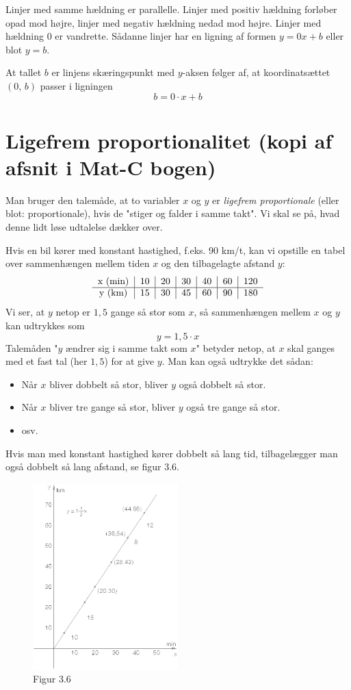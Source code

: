 \documentclass[12pt,oneside,a4paper]{article}
\begin{document}
Linjer med samme hældning er parallelle. Linjer med positiv hældning forløber
opad mod højre, linjer med negativ hældning nedad mod højre. Linjer med
hældning 0 er vandrette.  Sådanne linjer har en ligning af formen $y=0x+b$
eller blot $y=b$.

At tallet $b$ er linjens skæringspunkt med $y$-aksen følger af, at
koordinatsættet $(0,\,b)$ passer i ligningen
$$
b = 0\cdot x+b
$$

\section{Ligefrem proportionalitet (kopi af afsnit i Mat-C bogen)}
Man bruger den talemåde, at to variabler $x$ og $y$ er {\em ligefrem
proportionale} (eller blot: proportionale), hvis de "stiger og falder i samme
takt". Vi skal se på, hvad denne lidt løse udtalelse dækker over.

Hvis en bil kører med konstant hastighed, f.eks. 90 km/t, kan vi opstille en
tabel over sammenhængen mellem tiden $x$ og den tilbagelagte afstand $y$:
$$
\begin{tabular}{c|c|c|c|c|c|c}
    x ({\rm min}) & 10 & 20 & 30 & 40 & 60 & 120 \\
    \hline
    y ({\rm km})  & 15 & 30 & 45 & 60 & 90 & 180  
\end{tabular}
$$
Vi ser, at $y$ netop er $1,5$ gange så stor som $x$, så sammenhængen mellem $x$
og $y$ kan udtrykkes som
$$
y = 1,5\cdot x
$$
Talemåden "$y$ ændrer sig i samme takt som $x$" betyder netop, at $x$ skal
ganges med et fast tal (her $1,5$) for at give $y$. Man kan også udtrykke det
sådan:
\begin{itemize}
    \item Når $x$ bliver dobbelt så stor, bliver $y$ også dobbelt så stor.
    \item Når $x$ bliver tre gange så stor, bliver $y$ også tre gange så stor.
    \item osv.
\end{itemize}
Hvis man med konstant hastighed kører dobbelt så lang tid, tilbagelægger man
også dobbelt så lang afstand, se figur 3.6.

\begin{figure}[ht]
    \centering
    \includegraphics[width=0.5\textwidth]{fig36}
    \caption{Figur 3.6}
    \label{fig36}
\end{figure}
\end{document}
